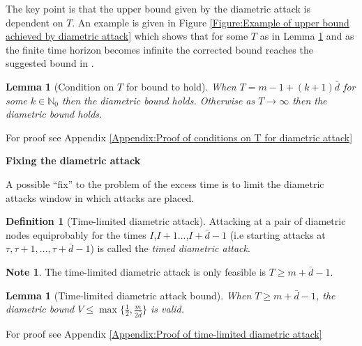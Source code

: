 \documentclass[a4paper,10pt]{article}
\newtheorem{lemma}[theorem]{Lemma}
\theoremstyle{definition}
\newtheorem{definition}[theorem]{Definition}
\theoremstyle{definition}
\theoremstyle{remark}
\theoremstyle{definition}
\newtheorem*{note}{Note}
\begin{document}
The key point is that the upper bound given by the diametric attack is dependent on $T$. An example is given in Figure \ref{Figure:Example of upper bound achieved by diametric attack} which shows that for some $T$ as in Lemma \ref{Lemma:Condition on time horizon for diametric bound to hold} and as the finite time horizon becomes infinite the corrected bound reaches the suggested bound in \cite{Alpern2011}.

\begin{lemma}[Condition on $T$ for bound to hold]
\label{Lemma:Condition on time horizon for diametric bound to hold}
When $T=m-1+(k+1)\bar{d}$ for some $k \in \mathbb{N}_{0}$ then the diametric bound holds. Otherwise as $T \rightarrow \infty$ then the diametric bound holds.
\end{lemma}

For proof see Appendix \ref{Appendix:Proof of conditions on T for diametric attack}

\begin{myfigure}
\resizebox{0.95\linewidth}{!}{
}
\caption{Best Upper Bound achievable under the diametric strategy}
\label{Figure:Example of upper bound achieved by diametric attack}
\end{myfigure}

\textbf{Fixing the diametric attack}

A possible ``fix'' to the problem of the excess time is to limit the diametric attacks window in which attacks are placed.

\begin{definition}[Time-limited diametric attack]
Attacking at a pair of diametric nodes equiprobably for the times $I$,$I+1$...,$I+\bar{d}-1$ (i.e starting attacks at $\tau,\tau+1,...,\tau+\bar{d}-1$) is called the \textit{timed diametric attack}.
\end{definition}

\begin{note}
The time-limited diametric attack is only feasible is $T \geq m+\bar{d}-1$.
\end{note}

\begin{lemma}[Time-limited diametric attack bound]
When $T \geq m+ \bar{d}-1$, the diametric bound $V \leq \max\{\frac{1}{2},\frac{m}{2\bar{d}}\}$ is valid.
\end{lemma}

For proof see Appendix \ref{Appendix:Proof of time-limited diametric attack}
\end{document}
